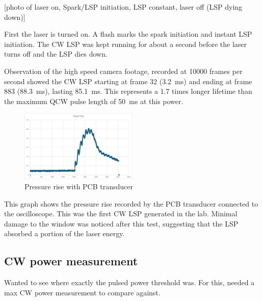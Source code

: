             [photo of laser on, Spark/LSP initiation, LSP constant, laser off (LSP dying down)]


            First the laser is turned on. A flash marks the spark initiation and instant LSP initiation. The CW LSP was kept running for about a second before the laser turns off and the LSP dies down.

            Observation of the high speed camera footage, recorded at 10000 frames per second showed the CW LSP starting at frame 32 (\qty{3.2}{ms}) and ending at frame 883 (\qty{88.3}{ms}), lasting \qty{85.1}{ms}. This represents a 1.7 times longer lifetime than the maximum QCW pulse length of \qty{50}{ms} at this power.


            \begin{figure}[!ht]
                \centering
                \includegraphics[width=0.5\textwidth]{assets/4 experiments/CW pressure rise.png}
                \caption{Pressure rise with PCB transducer}
            \end{figure}

            This graph shows the pressure rise recorded by the PCB transducer connected to the oscilloscope. This was the first CW LSP generated in the lab.  Minimal damage to the window was noticed after this test, suggesting that the LSP absorbed a portion of the laser energy.

        \subsection{CW power measurement}

            Wanted to see where exactly the pulsed power threshold was. For this, needed a max CW power measurement to compare against. 
    
